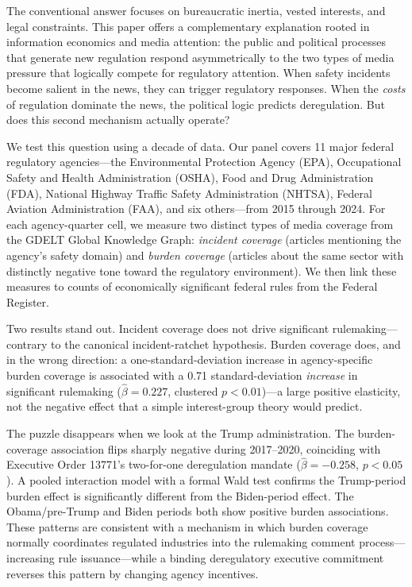 \documentclass[12pt]{article}
\begin{document}
The conventional answer focuses on bureaucratic inertia, vested interests, and legal constraints. This paper offers a complementary explanation rooted in information economics and media attention: the public and political processes that generate new regulation respond asymmetrically to the two types of media pressure that logically compete for regulatory attention. When safety incidents become salient in the news, they can trigger regulatory responses. When the \emph{costs} of regulation dominate the news, the political logic predicts deregulation. But does this second mechanism actually operate?

We test this question using a decade of data. Our panel covers 11 major federal regulatory agencies---the Environmental Protection Agency (EPA), Occupational Safety and Health Administration (OSHA), Food and Drug Administration (FDA), National Highway Traffic Safety Administration (NHTSA), Federal Aviation Administration (FAA), and six others---from 2015 through 2024. For each agency-quarter cell, we measure two distinct types of media coverage from the GDELT Global Knowledge Graph: \emph{incident coverage} (articles mentioning the agency's safety domain) and \emph{burden coverage} (articles about the same sector with distinctly negative tone toward the regulatory environment). We then link these measures to counts of economically significant federal rules from the Federal Register.

Two results stand out. Incident coverage does not drive significant rulemaking---contrary to the canonical incident-ratchet hypothesis. Burden coverage does, and in the wrong direction: a one-standard-deviation increase in agency-specific burden coverage is associated with a 0.71 standard-deviation \emph{increase} in significant rulemaking ($\hat\beta = 0.227$, clustered $p < 0.01$)---a large positive elasticity, not the negative effect that a simple interest-group theory would predict.

The puzzle disappears when we look at the Trump administration. The burden-coverage association flips sharply negative during 2017--2020, coinciding with Executive Order 13771's two-for-one deregulation mandate ($\hat\beta = -0.258$, $p < 0.05$). A pooled interaction model with a formal Wald test confirms the Trump-period burden effect is significantly different from the Biden-period effect. The Obama/pre-Trump and Biden periods both show positive burden associations. These patterns are consistent with a mechanism in which burden coverage normally coordinates regulated industries into the rulemaking comment process---increasing rule issuance---while a binding deregulatory executive commitment reverses this pattern by changing agency incentives.
\end{document}
